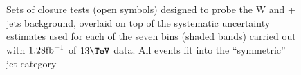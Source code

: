 \begin{figure}[h!]
  \begin{center}
     ~~
     \\
     ~~
     \\
    \caption{Sets of closure tests (open symbols) designed to probe
      the W and \ttbar + jets background, overlaid on top of
      the systematic uncertainty estimates used for each of the seven
      \scalht bins (shaded bands) carried out with $1.28\text{fb}^{-1}$ of
      $13\tev$ data. All events fit into the ``symmetric'' jet
      category}
    \label{fig:ttWclosureDataSym}
  \end{center} 
\end{figure}

